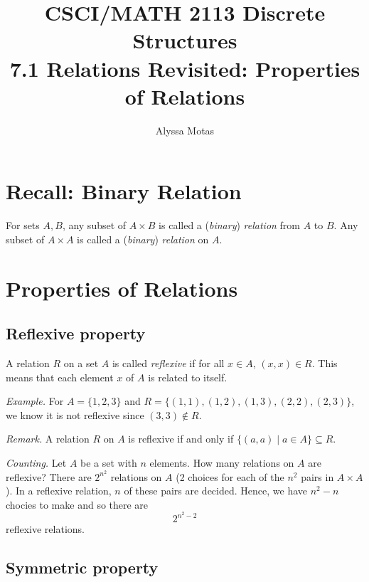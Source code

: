 \documentclass[11pt]{article}
\title{\textbf{CSCI/MATH 2113 Discrete Structures} \\ 7.1 Relations Revisited: Properties of Relations}
\author{Alyssa Motas}
\begin{document}
    \maketitle

    \pagebreak

    \tableofcontents

    \pagebreak

    \section{Recall: Binary Relation}

    For sets $A, B$, any subset of \(A \times B\) is called a (\emph{binary}) \emph{relation} from $A$ to $B$. Any subset of \(A \times A\) is called a (\emph{binary}) \emph{relation} on $A$.

    \section{Properties of Relations}

    \subsection{Reflexive property}

    A relation $R$ on a set $A$ is called \emph{reflexive} if for all \(x \in A\), \((x,x) \in R\). This means that each element $x$ of $A$ is related to itself. 

    \vspace{1em}

    \emph{Example.} For \(A = \{1,2,3\}\) and \(R = \{(1,1), (1,2), (1,3), (2,2), (2,3)\}\), we know it is not reflexive since \((3,3) \notin R\).

    \vspace{1em}

    \emph{Remark.} A relation $R$ on $A$ is reflexive if and only if \(\{(a,a) \mid a \in A\} \subseteq R\).

    \vspace{1em}

    \emph{Counting.} Let $A$ be a set with $n$ elements. How many relations on $A$ are reflexive? There are \(2^{n^2}\) relations on $A$ (2 choices for each of the $n^2$ pairs in $A \times A$). In a reflexive relation, $n$ of these pairs are decided. Hence, we have \(n^2 - n\) chocies to make and so there are  \[2^{n^2 - 2}\] reflexive relations.

    \subsection{Symmetric property}
\end{document}
